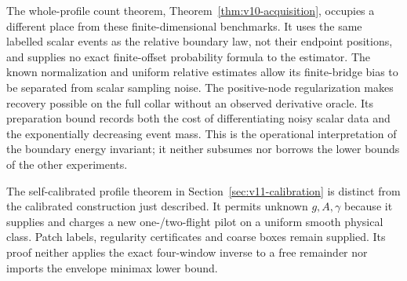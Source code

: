 
The whole-profile count theorem, Theorem~\ref{thm:v10-acquisition},
occupies a different place from these finite-dimensional benchmarks.
It uses the same labelled scalar events as the relative boundary law,
not their endpoint positions, and supplies no exact finite-offset
probability formula to the estimator. The known normalization and
uniform relative estimates allow its finite-bridge bias to be separated
from scalar sampling noise. The positive-node regularization makes
recovery possible on the full collar without an observed derivative
oracle. Its preparation bound records both the cost of differentiating
noisy scalar data and the exponentially decreasing event mass. This
is the operational interpretation of the boundary energy invariant;
it neither subsumes nor borrows the lower bounds of the other experiments.

The self-calibrated profile theorem in
Section~\ref{sec:v11-calibration} is distinct from the calibrated
construction just described. It permits unknown $g,A,\gamma$ because
it supplies and charges a new one-/two-flight pilot on a uniform smooth
physical class. Patch labels, regularity certificates and coarse boxes
remain supplied. Its proof neither applies the exact four-window inverse
to a free remainder nor imports the envelope minimax lower bound.

